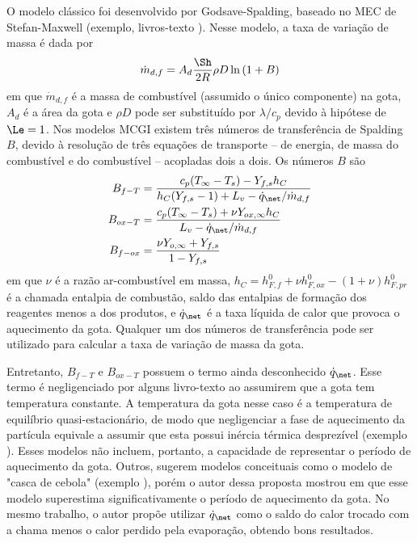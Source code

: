 O modelo clássico foi desenvolvido por Godsave-Spalding, baseado no MEC de Stefan-Maxwell (exemplo, livros-texto \cite{Glassman2008,Law2006,Turns2000}).
Nesse modelo, a taxa de variação de massa é dada por
\begin{equation}
    \dot m_{d,f} = A_d \frac{\Sh}{2R} \rho D \ln{(1 + B)} \label{eq:m_evap_B_M_2}
\end{equation}
em que $\dot m_{d,f}$ é a massa de combustível (assumido o único componente) na gota, $A_d$ é a área da gota e $\rho D$ pode ser substituído por $\lambda/c_p$ devido à hipótese de $\Le=1$.
Nos modelos MCGI existem três números de transferência de Spalding $B$, devido à resolução de três equações de transporte -- de energia, de massa do combustível e do combustível -- acopladas dois a dois.
Os números $B$ são
\begin{align}
    B_{f-T}  &= \frac{c_p(T_\infty - T_s) - Y_{f,s} h_C}{h_C(Y_{f,s} - 1) + L_v - \dot q_{\net}/\dot m_{d,f}} \label{eq:B_fq}\\
    B_{ox-T} &= \frac{c_p(T_\infty - T_s) + \nu Y_{ox,\infty}h_C}{L_v  - \dot q_{\net}/\dot m_{d,f}} \label{eq:B_oq}\\
    B_{f-ox} &= \frac{\nu Y_{o,\infty} + Y_{f,s}}{1 - Y_{f,s}} \label{eq:B_fo}
\end{align}
em que $\nu$ é a razão ar-combustível em massa, $h_C=h^0_{F,f} + \nu h^0_{F,ox} - (1+\nu)h^0_{F,pr}$ é a chamada entalpia de combustão, saldo das entalpias de formação dos reagentes menos a dos produtos, e $\dot q_\net$ é a taxa líquida de calor que provoca o aquecimento da gota.
Qualquer um dos números de transferência pode ser utilizado para calcular a taxa de variação de massa da gota.

Entretanto, $B_{f-T}$ e $B_{ox-T}$ possuem o termo ainda desconhecido $\dot q_\net$.
Esse termo é negligenciado por alguns livro-texto \cite{Glassman2008,Williams1985} ao assumirem que a gota tem temperatura constante. 
A temperatura da gota nesse caso é a temperatura de equilíbrio quasi-estacionário, de modo que negligenciar a fase de aquecimento da partícula equivale a assumir que esta possui inércia térmica desprezível (exemplo \cite{Turns2000,Glassman2008}). 
Esses modelos não incluem, portanto, a capacidade de representar o  período de aquecimento da gota.
Outros, sugerem modelos conceituais como o modelo de "casca de cebola" (exemplo \cite[p. 385]{Turns2000}), porém o autor dessa proposta mostrou em \cite{HenningsJ2024MT} que esse modelo superestima significativamente o período de aquecimento da gota.
No mesmo trabalho, o autor propõe utilizar $\dot q_\net$ como o saldo do calor trocado com a chama menos o calor perdido pela evaporação, obtendo bons resultados.


